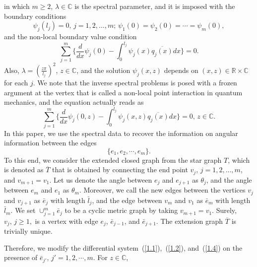 \documentclass[10pt,a4paper]{article}
\theoremstyle{plain}
\theoremstyle{definition}
\theoremstyle{remark}
\numberwithin{equation}{section}
\begin{document}
in which $m\geq2$, $\lambda\in\mathbb{C}$ is the spectral parameter,
and it is imposed with the boundary conditions
\begin{equation}\label{1.2}
\psi_{j}(l_{j})=0,\,j=1,2,\ldots,m;\,\psi_{1}(0)=\psi_{2}(0)=\cdots=\psi_{m}(0),
\end{equation}
and the non-local boundary value condition
\begin{equation}\label{1.3}
\sum_{j=1}^{m}\big\{\frac{d}{dx}\psi_{j}(0)-\int_{0}^{l_{j}}\psi_{j}(x)\overline{q_{j}(x)}dx\big\}=0.
\end{equation}
Also, $\lambda=(\frac{z\pi}{l_{j}})^{2}$, $z\in\mathbb{C}$, and the solution $\psi_{j}(x,z)$ depends on $(x,z)\in\mathbb{R}\times\mathbb{C}$ for each $j$.
We note that the inverse spectral problems is posed with a frozen argument at the vertex that is called a non-local point interaction in quantum mechanics, and  the equation actually reads as
\begin{equation}\label{1.4}
\sum_{j=1}^{m}\big\{\frac{d}{dx}\psi_{j}(0,z)-\int_{0}^{l_{j}}\psi_{j}(x,z)\overline{q_{j}(x)}dx\big\}=0,\,z\in\mathbb{C}.
\end{equation}
In this paper, we use the spectral data to recover the information on angular information between the edges $$\{e_{1},e_{2},\cdots,e_{m}\}.$$
To this end, we consider the extended closed graph from the star graph $T$, which is denoted as $\overline{T}$ that is obtained by connecting the end point $v_{j}$, $j=1,2,\ldots,m$, and $v_{m+1}=v_{1}$. Let us denote the angle between $e_{j}$ and $e_{j+1}$ as $\theta_{j}$, and the angle between $e_{m}$ and $e_{1}$ as $\theta_{m}$. Moreover, we call the new edges between the vertices $v_{j}$ and $v_{j+1}$ as $\bar{e}_{j}$ with length $\bar{l}_{j}$, and the edge between $v_{m}$ and $v_{1}$ as $\bar{e}_{m}$ with length $\bar{l}_{m}$. 
We set $\cup_{j=1}^{m}\bar{e}_{j}$ to be a cyclic metric graph by taking $v_{m+1}=v_{1}$.
Surely, $v_{j},\,j\geq1,$ is a vertex with edge $e_{j}$, $\bar{e}_{j-1}$, and $\bar{e}_{j+1}$. The extension graph $\overline{T}$ is trivially unique.
\par
Therefore, we modify the differential system~(\ref{1.1}),~(\ref{1.2}), and~(\ref{1.4}) on the presence of  $\bar{e}_{j'}$, $j'=1,2,\cdots,m.$ For $z\in\mathbb{C}$,
\end{document}
